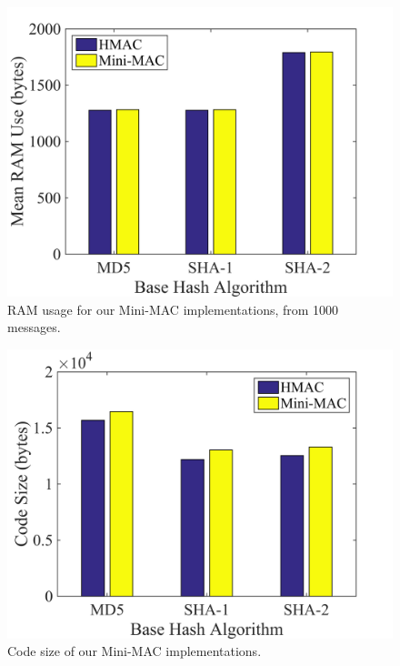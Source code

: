 	\begin{figure}
		\centering
		\includegraphics[width=\columnwidth]{figures/ram_usage.png}
		\caption{RAM usage for our Mini-MAC implementations, from 1000 messages.}
		\label{fig-ram}
	\end{figure}
	
	\begin{figure}
		\centering
		\includegraphics[width=\columnwidth]{figures/code_size.png}
		\caption{Code size of our Mini-MAC implementations.}
		\label{fig-code}
	\end{figure}
	
	
	